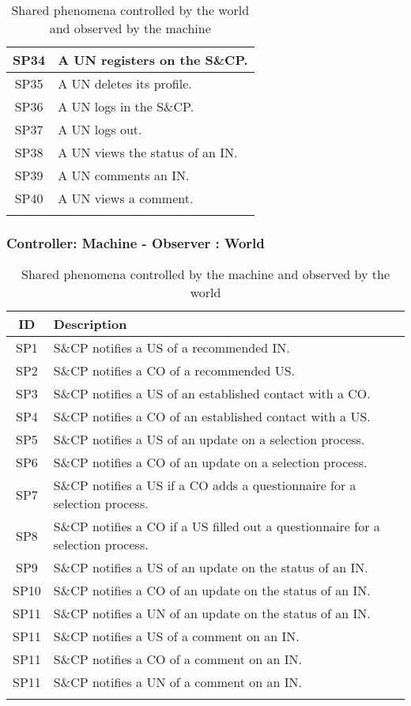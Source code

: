 \begin{longtable}{|c|p{10.5cm}|}
    SP34 & A UN registers on the S\&CP. \\ \hline
    SP35 & A UN deletes its profile. \\ \hline
    SP36 & A UN logs in the S\&CP. \\ \hline
    SP37 & A UN logs out. \\ \hline
    SP38 & A UN views the status of an IN. \\ \hline
    SP39 & A UN comments an IN. \\ \hline
    SP40 & A UN views a comment. \\ \hline
\caption{Shared phenomena controlled by the world and observed by the machine}
\end{longtable}



\subsubsection{Controller: Machine - Observer : World}
\renewcommand{\arraystretch}{1.5}
\begin{longtable}{|c|p{10.5cm}|}
    \hline \rowcolor{polimiblue!40}
    \textbf{ID} & \textbf{Description} \\ \hline
    SP1 & S\&CP notifies a US of a recommended IN. \\ \hline
    SP2 & S\&CP notifies a CO of a recommended US. \\ \hline
    SP3 & S\&CP notifies a US of an established contact with a CO. \\ \hline
    SP4 & S\&CP notifies a CO of an established contact with a US. \\ \hline
    SP5 & S\&CP notifies a US of an update on a selection process. \\ \hline
    SP6 & S\&CP notifies a CO of an update on a selection process. \\ \hline
    SP7 & S\&CP notifies a US if a CO adds a questionnaire for a selection process. \\ \hline
    SP8 & S\&CP notifies a CO if a US filled out a questionnaire for a selection process. \\ \hline
    SP9 & S\&CP notifies a US of an update on the status of an IN. \\ \hline
    SP10 & S\&CP notifies a CO of an update on the status of an IN. \\ \hline
    SP11 & S\&CP notifies a UN of an update on the status of an IN. \\ \hline
    SP11 & S\&CP notifies a US of a comment on an IN. \\ \hline
    SP11 & S\&CP notifies a CO of a comment on an IN. \\ \hline
    SP11 & S\&CP notifies a UN of a comment on an IN. \\ \hline
\caption{Shared phenomena controlled by the machine and observed by the world}
\end{longtable}

